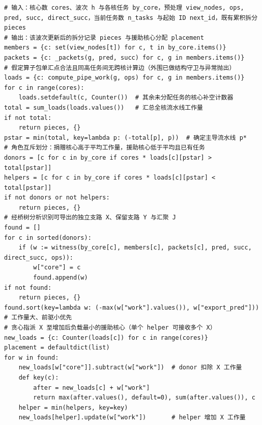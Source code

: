 \documentclass[anonymous,withtoc]{gmcm2026}
\renewcommand{\thealgorithm}{\thesection-\arabic{algorithm}}
\begin{document}
\par{}\begingroup\normalsize
\captionsetup{type=algorithm,position=top,justification=raggedright,singlelinecheck=false,labelfont=bf}
\label{alg:p1-branch-aid}
\nopagebreak
\begin{tcolorbox}[enhanced,breakable,colback=white,colframe=black,
  boxrule=0pt,toprule=.4pt,bottomrule=.4pt,sharp corners,boxsep=0pt,
  left=0pt,right=0pt,top=4pt,bottom=4pt,before skip=2pt,after skip=2pt,
  title after break={算法~\thealgorithm（续）},
  colbacktitle=white,coltitle=black,fonttitle=\normalsize\bfseries]


\begin{lstlisting}[style=paperpseudo]
# 输入：核心数 cores、波次 h 与各核任务 by_core，预处理 view_nodes, ops, pred, succ, direct_succ，当前任务数 n_tasks 与起始 ID next_id，既有累积拆分 pieces
# 输出：该波次更新后的拆分记录 pieces 与援助核心分配 placement
members = {c: set(view_nodes[t]) for c, t in by_core.items()}
packets = {c: _packets(g, pred, succ) for c, g in members.items()}
# 假定算子包单汇点合法且同高任务间无跨核计算边（外围已做结构守卫与异常抛出）
loads = {c: compute_pipe_work(g, ops) for c, g in members.items()}
for c in range(cores):
    loads.setdefault(c, Counter())  # 其余未分配任务的核心补空计数器
total = sum_loads(loads.values())   # 汇总全核流水线工作量
if not total:
    return pieces, {}
pstar = min(total, key=lambda p: (-total[p], p))  # 确定主导流水线 p*
# 角色互斥划分：捐赠核心高于平均工作量，援助核心低于平均且已有任务
donors = [c for c in by_core if cores * loads[c][pstar] > total[pstar]]
helpers = [c for c in by_core if cores * loads[c][pstar] < total[pstar]]
if not donors or not helpers:
    return pieces, {}
# 经桥树分析识别可导出的独立支路 X、保留支路 Y 与汇聚 J
found = []
for c in sorted(donors):
    if (w := witness(by_core[c], members[c], packets[c], pred, succ, direct_succ, ops)):
        w["core"] = c
        found.append(w)
if not found:
    return pieces, {}
found.sort(key=lambda w: (-max(w["work"].values()), w["export_pred"]))  # 工作量大、前驱小优先
# 贪心指派 X 至增加后负载最小的援助核心（单个 helper 可接收多个 X）
new_loads = {c: Counter(loads[c]) for c in range(cores)}
placement = defaultdict(list)
for w in found:
    new_loads[w["core"]].subtract(w["work"])  # donor 扣除 X 工作量
    def key(c):
        after = new_loads[c] + w["work"]
        return max(after.values(), default=0), sum(after.values()), c
    helper = min(helpers, key=key)
    new_loads[helper].update(w["work"])       # helper 增加 X 工作量

\end{lstlisting}
\end{tcolorbox}
\end{document}
